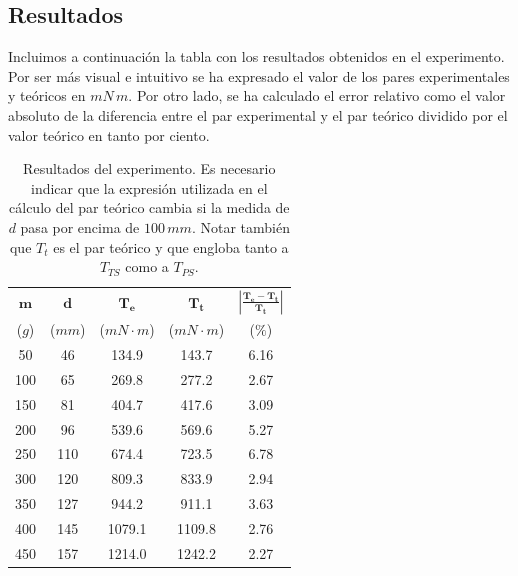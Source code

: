 \documentclass[12pt,a4paper]{article}
\begin{document}
\subsection*{Resultados}
Incluimos a continuación la tabla con los resultados obtenidos en el experimento. Por ser más visual e intuitivo se ha expresado el valor de los pares experimentales y teóricos en $mN\,m$. Por otro lado, se ha calculado el error relativo como el valor absoluto de la diferencia entre el par experimental y el par teórico dividido por el valor teórico en tanto por ciento.
\vspace{-0.3cm}
\begin{table}[htbp]
  \centering
    \begin{tabular}{ccccc}
    \toprule
    \multicolumn{1}{c}{$\mathbf{m}$} & \multicolumn{1}{c}{$\mathbf{d}$} & \multicolumn{1}{c}{$\mathbf{T_{e}}$} & \multicolumn{1}{c}{$\mathbf{T_{t}}$} & \multicolumn{1}{c}{$\boldsymbol{\left| \frac{T_{e}-T_{t}}{T_{t}} \right|}$} \\
      {\small ($g$)} & {\small ($mm$)} & {\small ($mN{\cdot}m$)} & {\small ($mN{\cdot}m$)} & {\small ($\%$)} \\    
    \midrule    
    50 & 46 & 134.9 & 143.7 & 6.16 \\
    100 & 65 & 269.8 & 277.2 & 2.67 \\
    150 & 81 & 404.7 & 417.6 & 3.09 \\
    200 & 96 & 539.6 & 569.6 & 5.27 \\
    250 & 110 & 674.4 & 723.5 & 6.78 \\
    300 & 120 & 809.3 & 833.9 & 2.94 \\
    350 & 127 & 944.2 & 911.1 & 3.63 \\
    400 & 145 & 1079.1 & 1109.8 & 2.76 \\
    450 & 157 & 1214.0 & 1242.2 & 2.27 \\
    \bottomrule
  \end{tabular}
   \caption{Resultados del experimento. Es necesario indicar que la expresión utilizada en el cálculo del par teórico cambia si la medida de \emph{$d$} pasa por encima de $100\, mm$. Notar también que $T_{t}$ es el par teórico y que engloba tanto a $T_{TS}$ como a $T_{PS}$.}
  \label{tab2}
\end{table}
\end{document}
